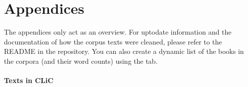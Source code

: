 \documentclass[letterpaper,10pt,english]{sphinxmanual}
\begin{document}
\sphinxstepscope


\chapter{Appendices}
\label{\detokenize{appendices:appendices}}\label{\detokenize{appendices:a-list-of-texts-available-in-clic}}\label{\detokenize{appendices::doc}}
\sphinxAtStartPar
The appendices only act as an overview. For up\sphinxhyphen{}to\sphinxhyphen{}date information and
the documentation of how the corpus texts were cleaned, please refer to
the README in the  repository. You can also create a
dynamic list of the books in the corpora (and their word counts) using
the {\hyperref[\detokenize{clicanalysis/counts:counts}]{}} tab.
\subsubsection*{Texts in CLiC}
\end{document}
